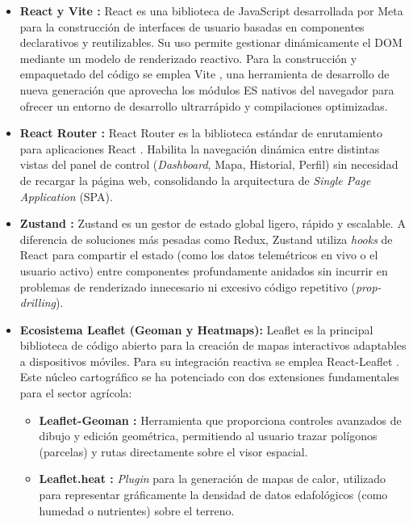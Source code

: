 \begin{itemize}
    \item \textbf{React \cite{react} y Vite \cite{vite}:} React \cite{react} es una biblioteca de JavaScript desarrollada por Meta para la construcción de interfaces de usuario basadas en componentes declarativos y reutilizables. Su uso permite gestionar dinámicamente el DOM mediante un modelo de renderizado reactivo. Para la construcción y empaquetado del código se emplea Vite \cite{vite}, una herramienta de desarrollo de nueva generación que aprovecha los módulos ES nativos del navegador para ofrecer un entorno de desarrollo ultrarrápido y compilaciones optimizadas.
    \item \textbf{React Router \cite{reactrouter}:} React Router \cite{reactrouter} es la biblioteca estándar de enrutamiento para aplicaciones React \cite{react}. Habilita la navegación dinámica entre distintas vistas del panel de control (\textit{Dashboard}, Mapa, Historial, Perfil) sin necesidad de recargar la página web, consolidando la arquitectura de \textit{Single Page Application} (SPA).
    \item \textbf{Zustand \cite{zustand}:} Zustand \cite{zustand} es un gestor de estado global ligero, rápido y escalable. A diferencia de soluciones más pesadas como Redux, Zustand \cite{zustand} utiliza \textit{hooks} de React \cite{react} para compartir el estado (como los datos telemétricos en vivo o el usuario activo) entre componentes profundamente anidados sin incurrir en problemas de renderizado innecesario ni excesivo código repetitivo (\textit{prop-drilling}).
    \item \textbf{Ecosistema Leaflet \cite{leaflet} (Geoman y Heatmaps):} Leaflet \cite{leaflet} es la principal biblioteca de código abierto para la creación de mapas interactivos adaptables a dispositivos móviles. Para su integración reactiva se emplea React-Leaflet \cite{leaflet}. Este núcleo cartográfico se ha potenciado con dos extensiones fundamentales para el sector agrícola:
    \begin{itemize}
        \item \textbf{Leaflet-Geoman \cite{leaflet}:} Herramienta que proporciona controles avanzados de dibujo y edición geométrica, permitiendo al usuario trazar polígonos (parcelas) y rutas directamente sobre el visor espacial.
        \item \textbf{Leaflet.heat \cite{leaflet}:} \textit{Plugin} para la generación de mapas de calor, utilizado para representar gráficamente la densidad de datos edafológicos (como humedad o nutrientes) sobre el terreno.

\end{itemize}
\end{itemize}
